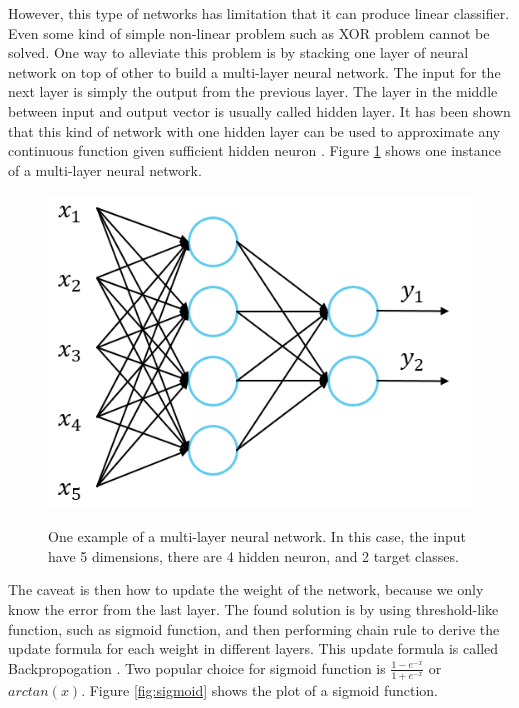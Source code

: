 \documentclass[a4paper,11pt]{kth-mag}
\begin{document}
However, this type of networks has limitation that it can produce linear classifier. Even some kind of simple non-linear problem such as XOR problem cannot be solved. One way to alleviate this problem is by stacking one layer of neural network on top of other to build a multi-layer neural network. The input for the next layer is simply the output from the previous layer. The layer in the middle between input and output vector is usually called hidden layer. It has been shown that this kind of network with one hidden layer can be used to approximate any continuous function given sufficient hidden neuron \cite{cybenko1989}. Figure \ref{fig:multilayer} shows one instance of a multi-layer neural network.

\begin{figure}[h]
\centering
\includegraphics[scale=0.4]{image/multilayer.png}
\label{fig:multilayer}
\caption{One example of a multi-layer neural network. In this case, the input have 5 dimensions, there are 4 hidden neuron, and 2 target classes.}
\end{figure}

The caveat is then how to update the weight of the network, because we only know the error from the last layer. The found solution is by using threshold-like function, such as sigmoid function, and then performing chain rule to derive the update formula for each weight in different layers. This update formula is called Backpropogation \cite{rumelhart1986backprop}. Two popular choice for sigmoid function is $\frac{1-e^{-x}}{1+e^{-x}}$ or $arctan(x)$. Figure \ref{fig:sigmoid} shows the plot of a sigmoid function.
\end{document}
